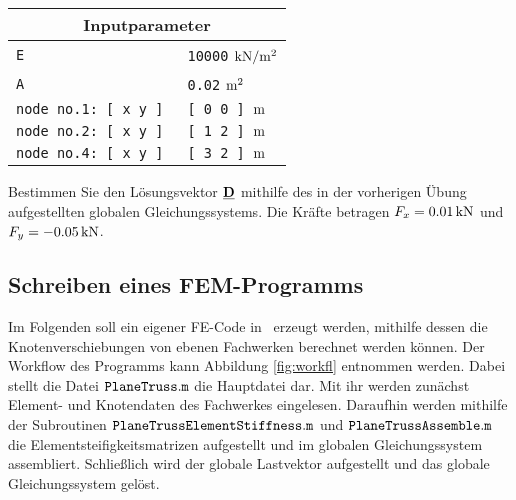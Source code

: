 \begin{minipage}[b]{0.46\textwidth}
   \scalebox{0.8}{}
  \label{fig:ten083}
\end{minipage}
 \hfill
\begin{minipage}[b]{0.46\textwidth}
 \begin{tabular}{ll}
  \multicolumn{2}{c}{Inputparameter}\\
\toprule
\tt E & {\tt 10000} $\mathrm{kN}/\mathrm{m}^2$\\
\tt A & {\tt 0.02} $\mathrm{m}^2$ \\
\tt node no.1: [ x y ] & \tt [ 0 0 ] $\mathrm{m}$ \\
\tt node no.2: [ x y ] & \tt [ 1 2 ] $\mathrm{m}$ \\
\tt node no.4: [ x y ] & \tt [ 3 2 ] $\mathrm{m}$ \\
\midrule
\end{tabular}
\label{tab:inppte}
 \end{minipage}\medskip

\enabres
 \item Bestimmen Sie den Lösungsvektor $\underline{{\bm{\mathrm{D}}}}$ mithilfe des in der vorherigen Übung aufgestellten globalen Gleichungssystems. 
 Die Kräfte betragen $F_x = 0.01\,\mathrm{kN}$ und $F_y = -0.05\, \mathrm{kN}$.
\enae




\subsection{Schreiben eines FEM-Programms}

Im Folgenden soll ein eigener FE-Code in \matl\ erzeugt werden, mithilfe dessen die Knotenverschiebungen von ebenen Fachwerken berechnet werden können.
Der Workflow des Programms kann Abbildung \ref{fig:workfl} entnommen werden.
Dabei stellt die Datei $\tt PlaneTruss.m$ die Hauptdatei dar. 
Mit ihr werden zunächst Element- und Knotendaten des Fachwerkes eingelesen.
Daraufhin werden mithilfe der Subroutinen $\tt PlaneTrussElementStiffness.m$ und $\tt PlaneTrussAssemble.m$ die Elementsteifigkeitsmatrizen aufgestellt und im globalen Gleichungssystem assembliert.
Schließlich wird der globale Lastvektor aufgestellt und das globale Gleichungssystem gelöst.\medskip

